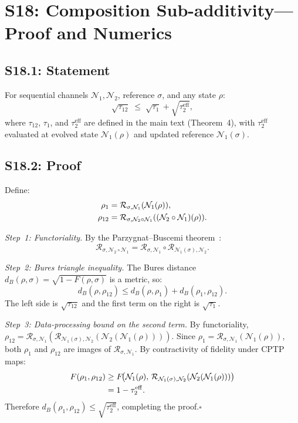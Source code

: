 \documentclass[prl,twocolumn,superscriptaddress,longbibliography]{revtex4-2}
\newcommand{\Petz}{\mathcal{R}}
\newcommand{\chan}{\mathcal{N}}
\newcommand{\tauasym}{\tau}
\begin{document}
\section{S18: Composition Sub-additivity---Proof and Numerics}
\label{sec:S18}

\subsection{S18.1: Statement}

For sequential channels $\chan_1, \chan_2$, reference $\sigma$,
and any state $\rho$:
\begin{equation}
\sqrt{\tauasym_{12}}
\;\leq\; \sqrt{\tauasym_1}
+ \sqrt{\tauasym_2^{\mathrm{eff}}},
\label{eq:comp_supp}
\end{equation}
where $\tauasym_{12}$, $\tauasym_1$, and
$\tauasym_2^{\mathrm{eff}}$ are defined in the main text
(Theorem~4), with $\tauasym_2^{\mathrm{eff}}$ evaluated at
evolved state $\chan_1(\rho)$ and updated reference
$\chan_1(\sigma)$.

\subsection{S18.2: Proof}

Define:
\begin{align}
\rho_1 &= \Petz_{\sigma,\chan_1}(\chan_1(\rho)),
  \notag\\
\rho_{12} &= \Petz_{\sigma,\chan_2\circ\chan_1}
  ((\chan_2\circ\chan_1)(\rho)).
\end{align}

\emph{Step~1: Functoriality.}
By the Parzygnat--Buscemi theorem~\cite{Parzygnat2023}:
\begin{equation}
\Petz_{\sigma,\chan_2\circ\chan_1}
= \Petz_{\sigma,\chan_1}\circ
  \Petz_{\chan_1(\sigma),\chan_2}.
\end{equation}

\emph{Step~2: Bures triangle inequality.}
The Bures distance
$d_B(\rho,\sigma) = \sqrt{1-F(\rho,\sigma)}$ is a metric, so:
\begin{equation}
d_B(\rho,\rho_{12})
\leq d_B(\rho,\rho_1)
+ d_B(\rho_1,\rho_{12}).
\end{equation}
The left side is $\sqrt{\tauasym_{12}}$ and the first term on
the right is $\sqrt{\tauasym_1}$.

\emph{Step~3: Data-processing bound on the second term.}
By functoriality,
$\rho_{12} = \Petz_{\sigma,\chan_1}
(\Petz_{\chan_1(\sigma),\chan_2}(\chan_2(\chan_1(\rho))))$.
Since $\rho_1 = \Petz_{\sigma,\chan_1}(\chan_1(\rho))$, both
$\rho_1$ and $\rho_{12}$ are images of $\Petz_{\sigma,\chan_1}$.
By contractivity of fidelity under CPTP maps:
\begin{align}
F(\rho_1,\rho_{12})
&\geq F\!\big(\chan_1(\rho),\,
  \Petz_{\chan_1(\sigma),\chan_2}(\chan_2(\chan_1(\rho)))\big)
  \notag\\
&= 1 - \tauasym_2^{\mathrm{eff}}.
\end{align}
Therefore $d_B(\rho_1,\rho_{12})
\leq \sqrt{\tauasym_2^{\mathrm{eff}}}$, completing the
proof.\hfill$\square$
\end{document}
